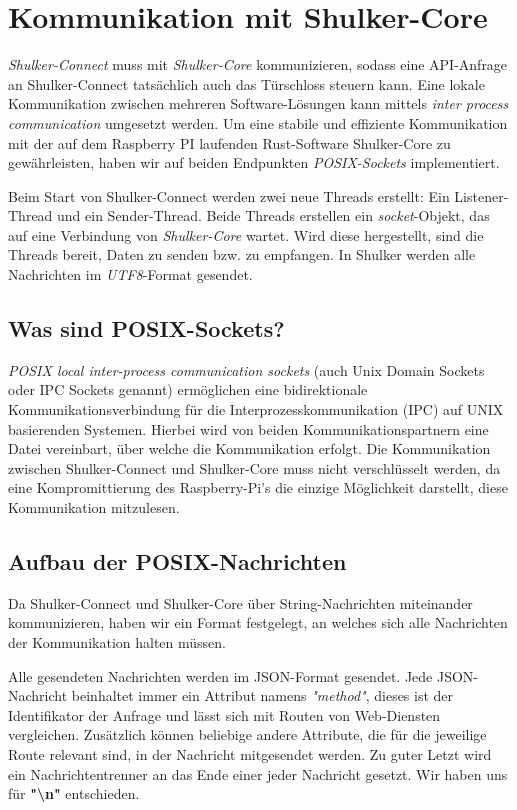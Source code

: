 \lstset{language=json}
\chapter{Kommunikation mit Shulker-Core}
\textit{Shulker-Connect} muss mit \textit{Shulker-Core} kommunizieren, sodass eine API-Anfrage an Shulker-Connect tatsächlich
auch das Türschloss steuern kann.
Eine lokale Kommunikation zwischen mehreren Software-Lösungen kann mittels
\textit{inter process communication} umgesetzt werden. 
Um eine stabile und effiziente Kommunikation mit der auf dem Raspberry PI laufenden Rust-Software Shulker-Core zu 
gewährleisten, haben wir auf beiden Endpunkten \textit{POSIX-Sockets} implementiert.

Beim Start von Shulker-Connect werden zwei neue Threads erstellt: Ein Listener-Thread und ein Sender-Thread.
Beide Threads erstellen ein \textit{socket}-Objekt, das auf eine Verbindung von \textit{Shulker-Core} wartet.
Wird diese hergestellt, sind die Threads bereit, Daten zu senden bzw. zu empfangen.
In Shulker werden alle Nachrichten im \textit{UTF8}-Format gesendet.

\section{Was sind POSIX-Sockets?}
\textit{POSIX local inter-process communication sockets} (auch Unix Domain Sockets oder IPC Sockets genannt) ermöglichen
eine bidirektionale Kommunikationsverbindung für die Interprozesskommunikation (IPC) auf UNIX basierenden Systemen.
Hierbei wird von beiden Kommunikationspartnern eine Datei vereinbart, über welche die Kommunikation erfolgt. \cite{ipcsockets}
Die Kommunikation zwischen Shulker-Connect und Shulker-Core muss nicht verschlüsselt werden, da eine Kompromittierung des
Raspberry-Pi's die einzige Möglichkeit darstellt, diese Kommunikation mitzulesen. 

\section{Aufbau der POSIX-Nachrichten}
Da Shulker-Connect und Shulker-Core über String-Nachrichten miteinander kommunizieren, haben wir ein
Format festgelegt, an welches sich alle Nachrichten der Kommunikation halten müssen.


Alle gesendeten Nachrichten werden im JSON-Format gesendet. Jede JSON-Nachricht beinhaltet immer ein Attribut namens
\textit{"method"}, dieses ist der Identifikator der Anfrage und lässt sich mit Routen von Web-Diensten vergleichen.
Zusätzlich können beliebige andere Attribute, die für die jeweilige Route relevant sind, in der Nachricht mitgesendet werden.
Zu guter Letzt wird ein Nachrichtentrenner an das Ende einer jeder Nachricht gesetzt. Wir haben uns für
\textbf{"\textbackslash n"} entschieden.

